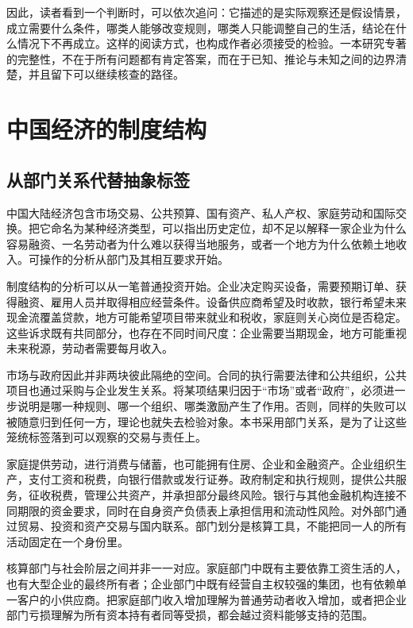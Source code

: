 \documentclass[UTF8,fontset=fandol,zihao=-4,oneside,openany]{ctexbook}
\begin{document}
因此，读者看到一个判断时，可以依次追问：它描述的是实际观察还是假设情景，成立需要什么条件，哪类人能够改变规则，哪类人只能调整自己的生活，结论在什么情况下不再成立。这样的阅读方式，也构成作者必须接受的检验。一本研究专著的完整性，不在于所有问题都有肯定答案，而在于已知、推论与未知之间的边界清楚，并且留下可以继续核查的路径。

\chapter{中国经济的制度结构}
\section{从部门关系代替抽象标签}
中国大陆经济包含市场交易、公共预算、国有资产、私人产权、家庭劳动和国际交换。把它命名为某种经济类型，可以指出历史定位，却不足以解释一家企业为什么容易融资、一名劳动者为什么难以获得当地服务，或者一个地方为什么依赖土地收入。可操作的分析从部门及其相互要求开始。

\label{arg:P018}
制度结构的分析可以从一笔普通投资开始。企业决定购买设备，需要预期订单、获得融资、雇用人员并取得相应经营条件。设备供应商希望及时收款，银行希望未来现金流覆盖贷款，地方可能希望项目带来就业和税收，家庭则关心岗位是否稳定。这些诉求既有共同部分，也存在不同时间尺度：企业需要当期现金，地方可能重视未来税源，劳动者需要每月收入。

市场与政府因此并非两块彼此隔绝的空间。合同的执行需要法律和公共组织，公共项目也通过采购与企业发生关系。将某项结果归因于“市场”或者“政府”，必须进一步说明是哪一种规则、哪一个组织、哪类激励产生了作用。否则，同样的失败可以被随意归到任何一方，理论也就失去检验对象。本书采用部门关系，是为了让这些笼统标签落到可以观察的交易与责任上。

家庭提供劳动，进行消费与储蓄，也可能拥有住房、企业和金融资产。企业组织生产，支付工资和税费，向银行借款或发行证券。政府制定和执行规则，提供公共服务，征收税费，管理公共资产，并承担部分最终风险。银行与其他金融机构连接不同期限的资金要求，同时在自身资产负债表上承担信用和流动性风险。对外部门通过贸易、投资和资产交易与国内联系。部门划分是核算工具，不能把同一人的所有活动固定在一个身份里。

\label{arg:P019}
核算部门与社会阶层之间并非一一对应。家庭部门中既有主要依靠工资生活的人，也有大型企业的最终所有者；企业部门中既有经营自主权较强的集团，也有依赖单一客户的小供应商。把家庭部门收入增加理解为普通劳动者收入增加，或者把企业部门亏损理解为所有资本持有者同等受损，都会越过资料能够支持的范围。
\end{document}

